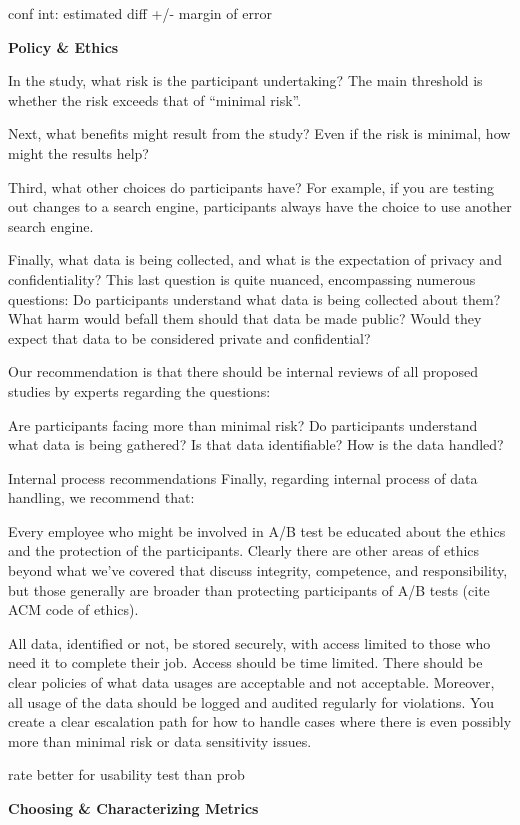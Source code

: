 \documentclass[]{book}
\theoremstyle{definition}
\theoremstyle{definition}
\theoremstyle{definition}
\theoremstyle{remark}
\begin{document}
conf int: estimated diff +/- margin of error

\textbf{Policy \& Ethics}

In the study, what risk is the participant undertaking? The main
threshold is whether the risk exceeds that of ``minimal risk''.

Next, what benefits might result from the study? Even if the risk is
minimal, how might the results help?

Third, what other choices do participants have? For example, if you are
testing out changes to a search engine, participants always have the
choice to use another search engine.

Finally, what data is being collected, and what is the expectation of
privacy and confidentiality? This last question is quite nuanced,
encompassing numerous questions: Do participants understand what data is
being collected about them? What harm would befall them should that data
be made public? Would they expect that data to be considered private and
confidential?

Our recommendation is that there should be internal reviews of all
proposed studies by experts regarding the questions:

Are participants facing more than minimal risk? Do participants
understand what data is being gathered? Is that data identifiable? How
is the data handled?

Internal process recommendations Finally, regarding internal process of
data handling, we recommend that:

Every employee who might be involved in A/B test be educated about the
ethics and the protection of the participants. Clearly there are other
areas of ethics beyond what we've covered that discuss integrity,
competence, and responsibility, but those generally are broader than
protecting participants of A/B tests (cite ACM code of ethics).

All data, identified or not, be stored securely, with access limited to
those who need it to complete their job. Access should be time limited.
There should be clear policies of what data usages are acceptable and
not acceptable. Moreover, all usage of the data should be logged and
audited regularly for violations. You create a clear escalation path for
how to handle cases where there is even possibly more than minimal risk
or data sensitivity issues.

rate better for usability test than prob

\textbf{Choosing \& Characterizing Metrics}
\end{document}

